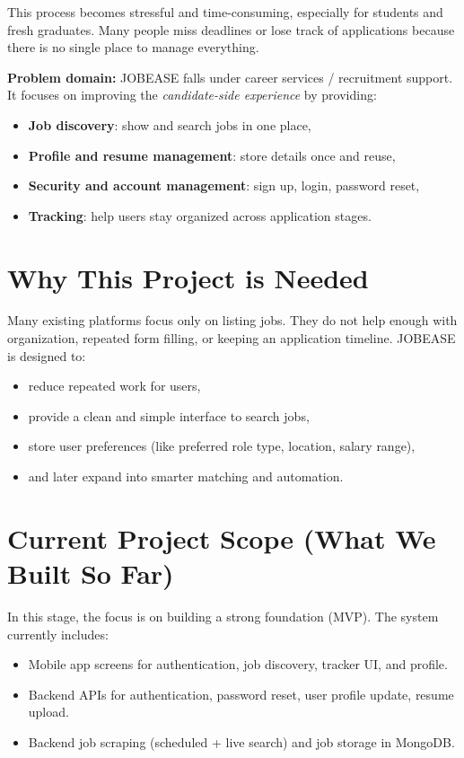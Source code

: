 \documentclass[12pt,a4paper]{report}
\begin{document}
\noindent
This process becomes stressful and time-consuming, especially for students and fresh graduates. Many people miss deadlines or lose track of applications because there is no single place to manage everything.

\medskip
\noindent
\textbf{Problem domain:} JOBEASE falls under career services / recruitment support. It focuses on improving the \textit{candidate-side experience} by providing:
\begin{itemize}[leftmargin=*, itemsep=4pt]
  \item \textbf{Job discovery}: show and search jobs in one place,
  \item \textbf{Profile and resume management}: store details once and reuse,
  \item \textbf{Security and account management}: sign up, login, password reset,
  \item \textbf{Tracking}: help users stay organized across application stages.
\end{itemize}

\section*{Why This Project is Needed}
\noindent
Many existing platforms focus only on listing jobs. They do not help enough with organization, repeated form filling, or keeping an application timeline. JOBEASE is designed to:
\begin{itemize}[leftmargin=*, itemsep=4pt]
  \item reduce repeated work for users,
  \item provide a clean and simple interface to search jobs,
  \item store user preferences (like preferred role type, location, salary range),
  \item and later expand into smarter matching and automation.
\end{itemize}

\section*{Current Project Scope (What We Built So Far)}
\noindent
In this stage, the focus is on building a strong foundation (MVP). The system currently includes:
\begin{itemize}[leftmargin=*, itemsep=4pt]
  \item Mobile app screens for authentication, job discovery, tracker UI, and profile.
  \item Backend APIs for authentication, password reset, user profile update, resume upload.
  \item Backend job scraping (scheduled + live search) and job storage in MongoDB.
\end{itemize}
\end{document}
